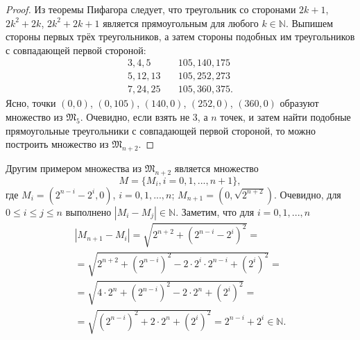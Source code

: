 \begin{proof}
	Из теоремы Пифагора следует, что треугольник со сторонами
	$2k+1$, $2k^2+2k$, $2k^2+2k+1$
	является прямоугольным для любого $k\in\mathbb{N}$.
	Выпишем стороны первых трёх треугольников,
	а затем стороны подобных им треугольников с совпадающей первой стороной:
	\begin{equation}
		\label{eq:PifagTriangles}
		\begin{array}{ll}
			3,  4,  5 & \quad 105, 140, 175 \\
			5, 12, 13 & \quad 105, 252, 273 \\
			7, 24, 25 & \quad 105, 360, 375.
		\end{array}
	\end{equation}
	Ясно, точки $(0,0)$, $(0,105)$, $(140,0)$, $(252,0)$, $(360,0)$
	образуют множество из $\mathfrak{M}_5$.
	Очевидно, если взять не 3, а $n$ точек, и затем найти подобные
	прямоугольные треугольники с совпадающей первой стороной,
	то можно построить множество из $\mathfrak{M}_{n+2}$.
\end{proof}

Другим примером множества из $\mathfrak{M}_{n+2}$ является множество
\begin{equation*}
	M = \{M_i, i =0,1,...,n+1\},
\end{equation*}
где
$M_i = (2^{n-i}-2^i,0)$, $i=0,1,...,n$;
$M_{n+1} = (0,\sqrt{2^{n+2}})$.
Очевидно, для $0\leqslant i \leqslant j \leqslant n$ выполнено
$|M_i- M_j|\in\mathbb{N}$.
Заметим, что для $i=0,1,...,n$
\begin{multline*}
	|M_{n+1} - M_i| =
	\sqrt{2^{n+2} + (2^{n-i}-2^i)^2}
	=
	\\=
	\sqrt{2^{n+2} + (2^{n-i})^2 - 2\cdot 2^i \cdot 2^{n-i} + (2^i)^2}
	=
	\\=
	\sqrt{4\cdot 2^{n} + (2^{n-i})^2 - 2\cdot 2^{n} + (2^i)^2}
	=
	\\=
	\sqrt{(2^{n-i})^2 + 2\cdot 2^{n} + (2^i)^2}
	=
	2^{n-i} + 2^i
	\in\mathbb{N}
	.
\end{multline*}

